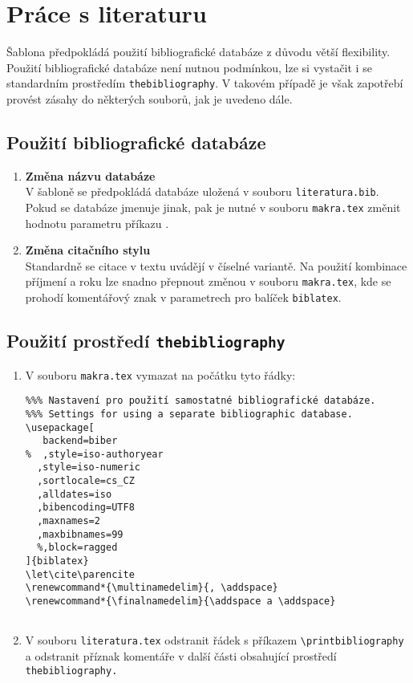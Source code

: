 
\chapter{Práce s literaturu}

Šablona předpokládá použití bibliografické databáze z důvodu větší flexibility. Použití bibliografické databáze není nutnou podmínkou, lze si vystačit i se standardním prostředím \texttt{thebibliography}. V takovém případě je však zapotřebí provést zásahy do některých souborů, jak je uvedeno dále.

\section{Použití bibliografické databáze}

\begin{enumerate}
\item\textbf{Změna názvu databáze}\\
V šabloně se předpokládá databáze uložená v souboru \texttt{literatura.bib}. Pokud se databáze jmenuje jinak, pak je nutné v souboru \texttt{makra.tex} změnit hodnotu parametru příkazu \verb''.
\item\textbf{Změna citačního stylu}\\
Standardně se citace v textu uvádějí v číselné variantě. Na použití kombinace příjmení a roku lze snadno přepnout změnou v souboru \texttt{makra.tex}, kde se prohodí komentářový znak v parametrech pro balíček \texttt{biblatex}.
\end{enumerate}


\section{Použití prostředí \texttt{thebibliography}}
\begin{enumerate}
\item V souboru \texttt{makra.tex} vymazat na počátku tyto řádky:
\begin{verbatim}
%%% Nastavení pro použití samostatné bibliografické databáze.
%%% Settings for using a separate bibliographic database.
\usepackage[
   backend=biber
%  ,style=iso-authoryear
  ,style=iso-numeric
  ,sortlocale=cs_CZ
  ,alldates=iso
  ,bibencoding=UTF8
  ,maxnames=2
  ,maxbibnames=99
  %,block=ragged
]{biblatex}
\let\cite\parencite
\renewcommand*{\multinamedelim}{, \addspace}
\renewcommand*{\finalnamedelim}{\addspace a \addspace}


\end{verbatim}
\item V souboru \texttt{literatura.tex} odstranit řádek s příkazem \verb'\printbibliography' a odstranit příznak komentáře v další části obsahující prostředí \texttt{thebibliography.}
\end{enumerate}


